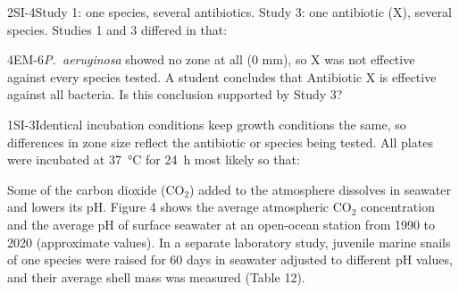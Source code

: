 \documentclass[11pt]{article}
\begin{document}
\begin{q}{2}{SI-4}{Study 1: one species, several antibiotics. Study 3: one antibiotic (X), several species.}
Studies 1 and 3 differed in that:
\end{q}

\begin{q}{4}{EM-6}{\textit{P.\ aeruginosa} showed no zone at all (0 mm), so X was not effective against every species tested.}
A student concludes that Antibiotic X is effective against all bacteria. Is this conclusion supported by Study 3?
\end{q}

\begin{q}{1}{SI-3}{Identical incubation conditions keep growth conditions the same, so differences in zone size reflect the antibiotic or species being tested.}
All plates were incubated at \SI{37}{\celsius} for \SI{24}{\hour} most likely so that:
\end{q}

Some of the carbon dioxide (CO$_2$) added to the atmosphere dissolves in seawater and lowers its pH. Figure 4 shows the average atmospheric CO$_2$ concentration and the average pH of surface seawater at an open-ocean station from 1990 to 2020 (approximate values). In a separate laboratory study, juvenile marine snails of one species were raised for 60 days in seawater adjusted to different pH values, and their average shell mass was measured (Table 12).
\end{document}
